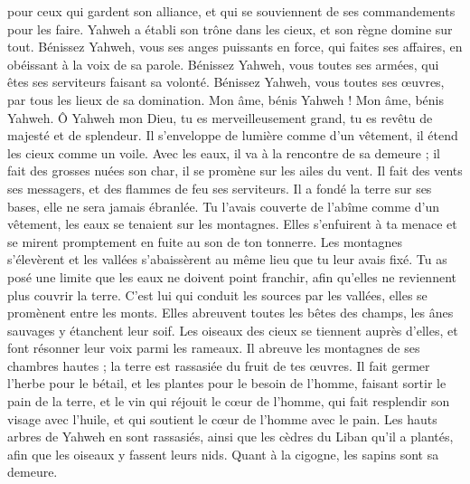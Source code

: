 \begin{multicols}{2}
pour ceux qui gardent son alliance, et qui se souviennent de ses commandements pour les faire.
Yahweh a établi son trône dans les cieux, et son règne domine sur tout.
Bénissez Yahweh, vous ses anges puissants en force, qui faites ses affaires, en obéissant à la voix de sa parole.
Bénissez Yahweh, vous toutes ses armées, qui êtes ses serviteurs faisant sa volonté.
Bénissez Yahweh, vous toutes ses œuvres, par tous les lieux de sa domination. Mon âme, bénis Yahweh !
\VerseOne{}Mon âme, bénis Yahweh. Ô Yahweh mon Dieu, tu es merveilleusement grand, tu es revêtu de majesté et de splendeur.
Il s'enveloppe de lumière comme d'un vêtement, il étend les cieux comme un voile.
Avec les eaux, il va à la rencontre de sa demeure ; il fait des grosses nuées son char, il se promène sur les ailes du vent.
Il fait des vents ses messagers, et des flammes de feu ses serviteurs.
Il a fondé la terre sur ses bases, elle ne sera jamais ébranlée.
Tu l'avais couverte de l'abîme comme d'un vêtement, les eaux se tenaient sur les montagnes.
Elles s'enfuirent à ta menace et se mirent promptement en fuite au son de ton tonnerre.
Les montagnes s'élevèrent et les vallées s'abaissèrent au même lieu que tu leur avais fixé.
Tu as posé une limite que les eaux ne doivent point franchir, afin qu'elles ne reviennent plus couvrir la terre.
C'est lui qui conduit les sources par les vallées, elles se promènent entre les monts.
Elles abreuvent toutes les bêtes des champs, les ânes sauvages y étanchent leur soif.
Les oiseaux des cieux se tiennent auprès d'elles, et font résonner leur voix parmi les rameaux.
Il abreuve les montagnes de ses chambres hautes ; la terre est rassasiée du fruit de tes œuvres.
Il fait germer l'herbe pour le bétail, et les plantes pour le besoin de l'homme, faisant sortir le pain de la terre,
et le vin qui réjouit le cœur de l'homme, qui fait resplendir son visage avec l'huile, et qui soutient le cœur de l'homme avec le pain.
Les hauts arbres de Yahweh en sont rassasiés, ainsi que les cèdres du Liban qu'il a plantés,
afin que les oiseaux y fassent leurs nids. Quant à la cigogne, les sapins sont sa demeure.

\end{multicols}
